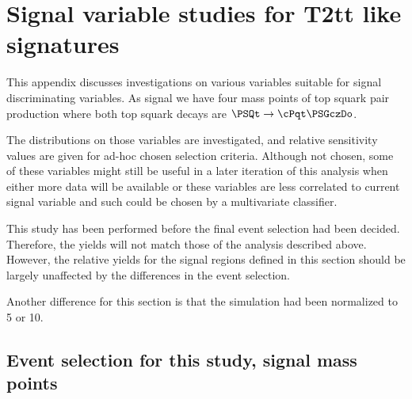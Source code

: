 \section{Signal variable studies for T2tt like signatures}
\label{sec:sigvarstudy}

This appendix discusses investigations on various variables suitable for signal discriminating variables. As signal we have four mass points of top squark pair production where both top squark decays are $\PSQt\to\cPqt\PSGczDo$.

The distributions on those variables are investigated, and relative sensitivity values are given for ad-hoc chosen selection criteria.
Although not chosen, some of these variables might still be useful in a later iteration of this analysis when either more data will be available or these variables are less correlated to current signal variable and such could be chosen by a multivariate classifier.

This study has been performed before the final event selection had been decided. Therefore, the yields will not match those of the analysis described above. However, the relative yields for the signal regions defined in this section should be largely unaffected by the differences in the event selection.

Another difference for this section is that the simulation had been normalized to 5 or 10\fbinv.

\subsection{Event selection for this study, signal mass points}
\label{sec:sigvarstudy:evtselection}

